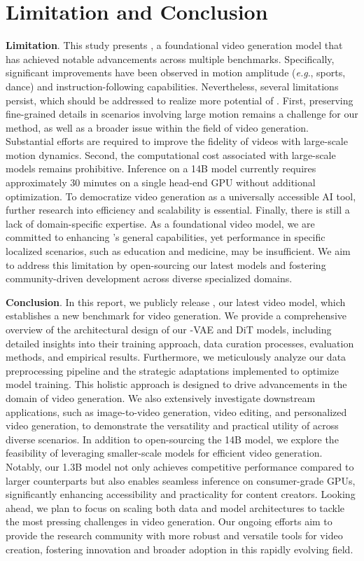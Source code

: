 \section{Limitation and Conclusion}
\label{sec:conclusion}

\textbf{Limitation}. This study presents \method, a foundational video generation model that has achieved notable advancements across multiple benchmarks.
Specifically, significant improvements have been observed in motion amplitude (\emph{e.g}., sports, dance) and instruction-following capabilities. 
%
Nevertheless, several limitations persist, which should be addressed to realize more potential of \method.
%
First, preserving fine-grained details in scenarios involving large motion remains a challenge for our method, as well as a broader issue within the field of video generation. 
%
Substantial efforts are required to improve the fidelity of videos with large-scale motion dynamics.
%
Second, the computational cost associated with large-scale models remains prohibitive. 
%
Inference on a 14B model currently requires approximately 30 minutes on a single head-end GPU without additional optimization. 
%
To democratize video generation as a universally accessible AI tool, further research into efficiency and scalability is essential.
%
Finally, there is still a lack of domain-specific expertise. As a foundational video model, we are committed to enhancing \method's general capabilities, yet performance in specific localized scenarios, such as education and medicine, may be insufficient. 
%
We aim to address this limitation by open-sourcing our latest models and fostering community-driven development across diverse specialized domains.


\textbf{Conclusion}. In this report, we publicly release \method, our latest video model, which establishes a new benchmark for video generation.
%
We provide a comprehensive overview of the architectural design of our \method-VAE and DiT models, including detailed insights into their training approach, data curation processes, evaluation methods, and empirical results.
%
Furthermore, we meticulously analyze our data preprocessing pipeline and the strategic adaptations implemented to optimize model training. 
%
This holistic approach is designed to drive advancements in the domain of video generation.
%
We also extensively investigate downstream applications, such as image-to-video generation, video editing, and personalized video generation, to demonstrate the versatility and practical utility of \method across diverse scenarios.
%
In addition to open-sourcing the 14B model, we explore the feasibility of leveraging smaller-scale models for efficient video generation. 
%
Notably, our 1.3B model not only achieves competitive performance compared to larger counterparts but also enables seamless inference on consumer-grade GPUs, significantly enhancing accessibility and practicality for content creators.
%
Looking ahead, we plan to focus on scaling both data and model architectures to tackle the most pressing challenges in video generation. 
%
Our ongoing efforts aim to provide the research community with more robust and versatile tools for video creation, fostering innovation and broader adoption in this rapidly evolving field.
